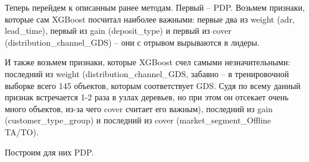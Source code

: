 Теперь перейдем к описанным ранее методам. Первый -- PDP. Возьмем признаки, которые сам XGBoost посчитал наиболее важными: первые два из weight (adr, lead\_time), первый из gain (deposit\_type) и первый из cover (distribution\_channel\_GDS) -- они с отрывом вырываются в лидеры.

И также возьмем признаки, которые XGBoost счел самыми незначительными: последний из weight (distribution\_channel\_GDS, забавно -- в тренировочной выборке всего 145 объектов, которым соответствует GDS. Судя по всему данный признак встречается 1-2 раза в узлах деревьев, но при этом он отсекает очень много объектов, из-за чего cover считает его важным), последний из gain (customer\_type\_group) и последний из cover (market\_segment\_Offline TA/TO).

Построим для них PDP.

